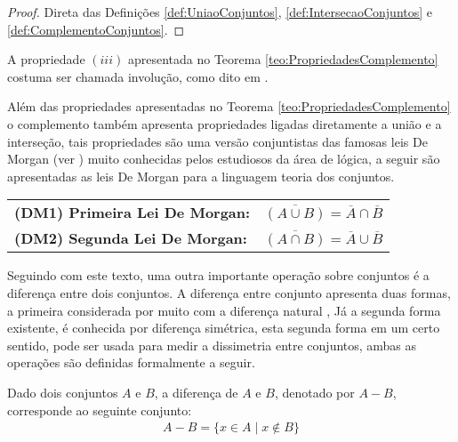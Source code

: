 \begin{proof}
	Direta das Definições \ref{def:UniaoConjuntos}, \ref{def:IntersecaoConjuntos} e \ref{def:ComplementoConjuntos}.
\end{proof}

\begin{nota}\label{note:Involucao}
  A propriedade $(iii)$ apresentada no Teorema \ref{teo:PropriedadesComplemento} costuma ser chamada involução, como dito em \cite{lipschutz1978-TC}.
\end{nota}

Além das propriedades apresentadas no Teorema \ref{teo:PropriedadesComplemento} o complemento também apresenta propriedades ligadas diretamente a união e a interseção, tais propriedades são uma versão conjuntistas das famosas leis De Morgan (ver \cite{carmo2013, joaoPavao2014, lipschutz2013-MD}) muito conhecidas pelos estudiosos da área de lógica, a seguir são apresentadas as leis De Morgan para a linguagem teoria dos conjuntos.

\begin{table*}[h]
	\centering
	\begin{tabular}{lc}
		\textbf{(DM1) Primeira Lei De Morgan:} & $\overline{(A \cup B)} = \overline{A} \cap \overline{B}$\\
		\textbf{(DM2) Segunda Lei De Morgan:} & $\overline{(A \cap B)} = \overline{A} \cup \overline{B}$\\
	\end{tabular}
\end{table*}

Seguindo com este texto, uma outra importante operação sobre conjuntos é a diferença entre dois conjuntos. A diferença entre conjunto apresenta duas formas, a primeira considerada por muito com a diferença natural \cite{carmo2013}, Já a segunda forma existente, é conhecida por diferença simétrica, esta segunda forma em um certo sentido, pode ser usada para medir a  dissimetria entre conjuntos, ambas as operações são definidas formalmente a seguir.

\begin{definicao}\label{def:DiferencaConjuntos}
	Dado dois conjuntos $A$ e $B$, a diferença de $A$ e $B$, denotado por $A - B$, corresponde ao seguinte conjunto:
  \begin{eqnarray*}
    A - B = \{x \in A \mid x \notin B\}
  \end{eqnarray*}
\end{definicao}

